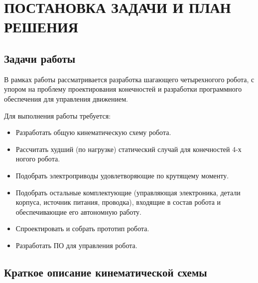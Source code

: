 \chapter{\MakeUppercase{Постановка задачи и план решения}}

\section{Задачи работы}

В рамках работы рассматривается разработка шагающего четырехногого робота, с упором на проблему проектирования конечностей и разработки программного обеспечения для управления движением.

Для выполнения работы требуется:
\begin{itemize}
    \item Разработать общую кинематическую схему робота.
    \item Рассчитать худший (по нагрузке) статический случай для конечностей 4-х ногого робота.
    \item Подобрать электроприводы удовлетворяющие по крутящему моменту.
    \item Подобрать остальные комплектующие (управляющая электроника, детали корпуса, источник питания, проводка), входящие в состав робота и обеспечивающие его автономную работу.
    \item Спроектировать и собрать прототип робота.
    \item Разработать ПО для управления робота.
\end{itemize}

\section{Краткое описание кинематической схемы}



